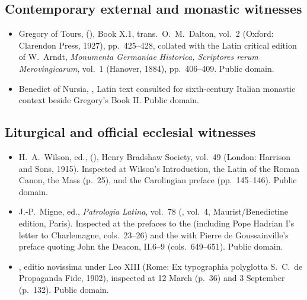\subsection*{Contemporary external and monastic witnesses}

\begin{itemize}
\item Gregory of Tours,  (), Book X.1, trans.\ O.\ M.\ Dalton, vol.~2 (Oxford: Clarendon
Press, 1927), pp.~425--428, collated with the Latin critical edition of
W.\ Arndt, \textit{Monumenta Germaniae Historica, Scriptores rerum
Merovingicarum}, vol.~1 (Hanover, 1884), pp.~406--409. Public domain.
\item Benedict of Nursia, , Latin text consulted for
sixth-century Italian monastic context beside Gregory's  Book II.
Public domain.
\end{itemize}

\subsection*{Liturgical and official ecclesial witnesses}

\begin{itemize}
\item H.\ A.\ Wilson, ed.,  (), Henry
Bradshaw Society, vol.~49 (London: Harrison and Sons, 1915). Inspected at
Wilson's Introduction, the Latin  of the Roman Canon, the
Mass  (p.~25), and the Carolingian
 preface (pp.~145--146). Public domain.
\item J.-P.\ Migne, ed., \textit{Patrologia Latina}, vol.~78 (, vol.~4, Maurist/Benedictine edition, Paris).
Inspected at the prefaces to the  (including Pope
Hadrian I's letter to Charlemagne, cols.\ 23--26) and the  with Pierre de Goussainville's preface
quoting John the Deacon,  II.6--9 (cols.\ 649--651).
Public domain.
\item {}, editio novissima under Leo XIII (Rome: Ex
typographia polyglotta S.\ C.\ de Propaganda Fide, 1902), inspected at 12 March
(p.~36) and 3 September (p.~132). Public domain.
\end{itemize}

